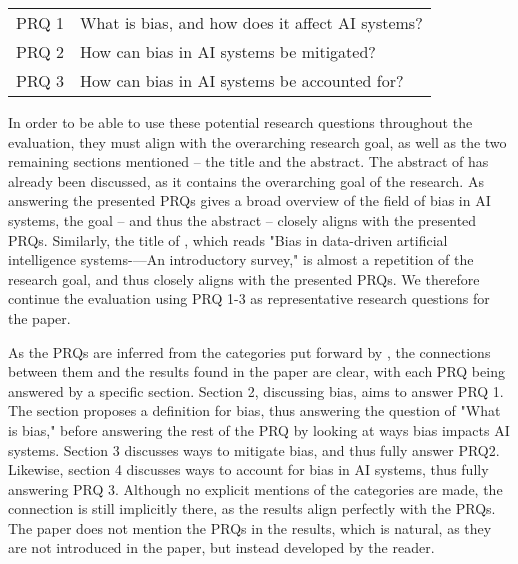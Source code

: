\begin{table}[h]
    \centering
    \begin{tabular}{cl}
        PRQ 1 & What is bias, and how does it affect AI systems? \\
        PRQ 2 & How can bias in AI systems be mitigated? \\
        PRQ 3 & How can bias in AI systems be accounted for? \\
    \end{tabular}
\end{table}

In order to be able to use these potential research questions throughout the evaluation, they must align with the overarching research goal, as well as the two remaining sections mentioned -- the title and the abstract. The abstract of \textcite{Ntoutsi_2020} has already been discussed, as it contains the overarching goal of the research. As answering the presented PRQs gives a broad overview of the field of bias in AI systems, the goal -- and thus the abstract -- closely aligns with the presented PRQs. Similarly, the title of \textcite{Ntoutsi_2020}, which reads "Bias in data-driven artificial intelligence systems-—An introductory survey," is almost a repetition of the research goal, and thus closely aligns with the presented PRQs. We therefore continue the evaluation using PRQ 1-3 as representative research questions for the paper.


As the PRQs are inferred from the categories put forward by \textcite{Ntoutsi_2020}, the connections between them and the results found in the paper are clear, with each PRQ being answered by a specific section. Section 2, discussing bias, aims to answer PRQ 1. The section proposes a definition for bias, thus answering the question of "What is bias," before answering the rest of the PRQ by looking at ways bias impacts AI systems. Section 3 discusses ways to mitigate bias, and thus fully answer PRQ2. Likewise, section 4 discusses ways to account for bias in AI systems, thus fully answering PRQ 3. Although no explicit mentions of the categories are made, the connection is still implicitly there, as the results align perfectly with the PRQs. The paper does not mention the PRQs in the results, which is natural, as they are not introduced in the paper, but instead developed by the reader.

